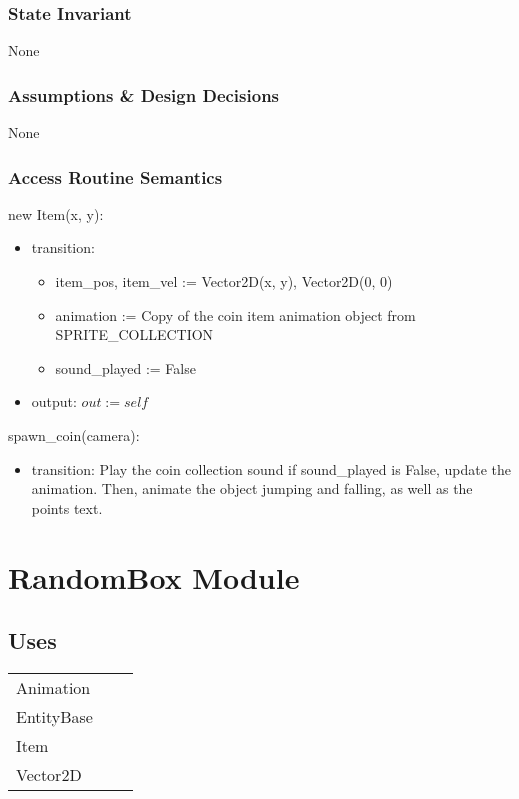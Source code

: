 \documentclass[12pt]{article}
\begin{document}
\subsubsection* {State Invariant}

None

\subsubsection* {Assumptions \& Design Decisions}

None

\subsubsection* {Access Routine Semantics}

new Item(x, y):
\begin{itemize}
    \item transition: 
    \begin{itemize}[]
        \item item\_pos, item\_vel := Vector2D(x, y), Vector2D(0, 0)
        \item animation := Copy of the coin item animation object from SPRITE\_COLLECTION
        \item sound\_played := False
    \end{itemize}
    \item output: $out := self$
\end{itemize}


\noindent spawn\_coin(camera):
\begin{itemize}
    \item transition: Play the coin collection sound if sound\_played is False, update the animation. Then, animate the object jumping and falling, as well as the points text.
\end{itemize}

\newpage

\section*{RandomBox Module}

\subsection* {Uses}

\begin{tabular}{lll}
    Animation & & \\
    EntityBase & & \\
    Item & & \\
    Vector2D & &
\end{tabular}
\end{document}
